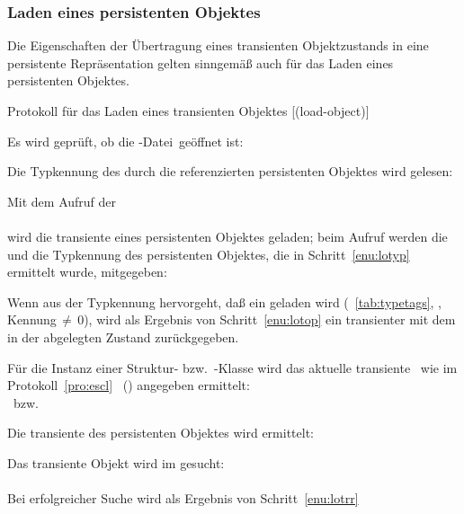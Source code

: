 \subsubsection{Laden eines persistenten Objektes}
%
Die Eigenschaften der \"{U}bertragung eines transienten Objektzustands in
eine persistente Re\-pr\"{a}\-sen\-ta\-tion gelten sinngem\"{a}\ss{} auch f\"{u}r
das Laden eines persistenten Objektes.
%
\begin{infol}%
%
\acaption%
 {Protokoll f\"{u}r das Laden eines transienten Objektes}%
 [(load-object)]%
 \label{pro:lobj}%
%
\item Es wird gepr\"{u}ft, ob die \sh-Datei\ ge\"{o}ffnet ist:\\
%
\item\label{enu:lotyp} Die Typkennung des durch die
\sobjid\/ referenzierten persistenten Objektes wird gelesen:\\
%
\item\label{enu:lotop} Mit dem Aufruf der \gfn[n]\\
\\
wird die transiente \representation{} eines persistenten Objektes
geladen; beim Aufruf werden die \sobjid\/ und die Typkennung des
persistenten Objektes, die in Schritt~\ref{enu:lotyp} ermittelt
wurde, mitgegeben:
%
\begin{block}%
%
\item Wenn aus der Typkennung hervorgeht, da\ss{} ein \immval\/ geladen
wird (\tablename~\ref{tab:typetags}, \citepage{\pageref{tab:typetags}},
Kennung\,$\neq$\,0), wird als Ergebnis von Schritt~\ref{enu:lotop} ein
transienter \immval\/ mit dem in der \sobjid\/ abgelegten Zustand
zur\"{u}ckgegeben.
%
\item\label{enu:lobjed} F\"{u}r die Instanz einer Struktur-
bzw.\ \clos-Klasse wird das aktuelle transiente \clsdo\ wie im
Protokoll~\ref{pro:escl}
\stfn{\enscldescr}\ (\citepage{\pageref{pro:escl}}) angegeben
ermittelt:\\
\stfn{\ensstdescr}\ bzw.\ \stfn{\enscldescr}
%
\item\label{enu:lotrr} Die transiente \representation{} des
persistenten Objektes wird ermittelt:
%
\begin{block}%
%
\item Das transiente Objekt wird im \cache\/ gesucht:\\
\\
Bei erfolgreicher Suche wird als Ergebnis von Schritt~\ref{enu:lotrr}

\end{block}
\end{block}
\end{infol}
